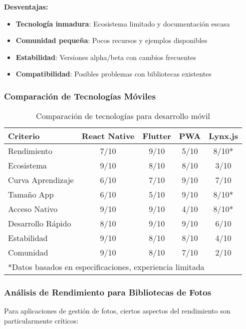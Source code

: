 \textbf{Desventajas:}
\begin{itemize}
    \item \textbf{Tecnología inmadura}: Ecosistema limitado y documentación escasa
    \item \textbf{Comunidad pequeña}: Pocos recursos y ejemplos disponibles
    \item \textbf{Estabilidad}: Versiones alpha/beta con cambios frecuentes
    \item \textbf{Compatibilidad}: Posibles problemas con bibliotecas existentes
\end{itemize}

\subsubsection{Comparación de Tecnologías Móviles}

\begin{table}[H]
\centering
\begin{tabular}{|l|c|c|c|c|}
\hline
\textbf{Criterio} & \textbf{React Native} & \textbf{Flutter} & \textbf{PWA} & \textbf{Lynx.js} \\
\hline
Rendimiento & 7/10 & 9/10 & 5/10 & 8/10* \\
Ecosistema & 9/10 & 8/10 & 8/10 & 3/10 \\
Curva Aprendizaje & 6/10 & 7/10 & 9/10 & 7/10 \\
Tamaño App & 6/10 & 5/10 & 9/10 & 8/10* \\
Acceso Nativo & 9/10 & 9/10 & 4/10 & 8/10* \\
Desarrollo Rápido & 8/10 & 9/10 & 9/10 & 6/10 \\
Estabilidad & 9/10 & 8/10 & 8/10 & 4/10 \\
Comunidad & 9/10 & 8/10 & 7/10 & 2/10 \\
\hline
\multicolumn{5}{|l|}{*Datos basados en especificaciones, experiencia limitada} \\
\hline
\end{tabular}
\caption{Comparación de tecnologías para desarrollo móvil}
\label{tab:mobile_tech_comparison}
\end{table}

\subsubsection{Análisis de Rendimiento para Bibliotecas de Fotos}

Para aplicaciones de gestión de fotos, ciertos aspectos del rendimiento son particularmente críticos:

